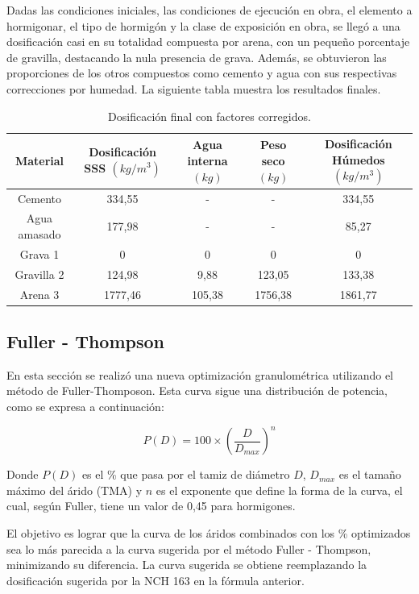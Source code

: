 Dadas las condiciones iniciales, las condiciones de ejecución en obra, el elemento a hormigonar, el tipo de hormigón y la clase de exposición en obra, se llegó a una dosificación casi en su totalidad compuesta por arena, con un pequeño porcentaje de gravilla, destacando la nula presencia de grava. Además, se obtuvieron las proporciones de los otros compuestos como cemento y agua con sus respectivas correcciones por humedad. La siguiente tabla muestra los resultados finales.

\begin{table}[H]
\centering
\caption{Dosificación final con factores corregidos.}
\begin{tabular}{|c|c|c|c|c|} %
\hline
\textbf{Material} & \textbf{Dosificación SSS $(kg/m^3)$} & \textbf{Agua interna $(kg)$} & \textbf{Peso seco $(kg)$} & \textbf{Dosificación Húmedos $(kg/m^3)$} \\ \hline
Cemento & 334,55 & - & - & 334,55 \\ \hline
Agua amasado & 177,98 & - & - & 85,27 \\ \hline
Grava 1 & 0 & 0 & 0 & 0 \\ \hline
Gravilla 2 & 124,98 & 9,88 & 123,05 & 133,38 \\ \hline
Arena 3 & 1777,46 & 105,38 & 1756,38 & 1861,77 \\ \hline
\end{tabular}
\label{tab:ejemplo}
\end{table}

\vspace{1cm}
\subsection{Fuller - Thompson}

En esta sección se realizó una nueva optimización granulométrica utilizando el método de Fuller-Thomposon. Esta curva sigue una distribución de potencia, como se expresa a continuación:

\begin{equation}
    P(D) = 100 \times (\frac{D}{D_{max}})^n
\end{equation}

Donde $P(D)$ es el \% que pasa por el tamiz de diámetro $D$, $D_{max}$ es el tamaño máximo del árido (TMA) y $n$ es el exponente que define la forma de la curva, el cual, según Fuller, tiene un valor de 0,45 para hormigones.

El objetivo es lograr que la curva de los áridos combinados con los \% optimizados sea lo más parecida a la curva sugerida por el método Fuller - Thompson, minimizando su diferencia. La curva sugerida se obtiene reemplazando la dosificación sugerida por la NCH 163 en la fórmula anterior.  

